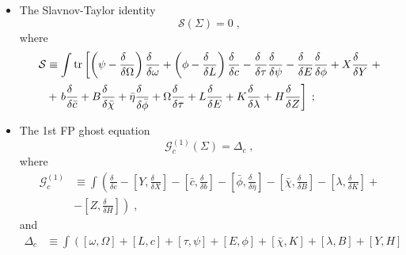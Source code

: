 \documentclass[../main.tex]{subfiles}
\begin{document}
\begin{itemize}
  \item  The Slavnov-Taylor identity
        \begin{equation}
          \label{eq:st-identity}
          \mathcal{S}\left(\Sigma\right)=0 \;,
        \end{equation}
        where
        \begin{align}
          \label{eq:SToperator}
          \mathcal{S} & \equiv \int \tr\left[\left(\psi-\frac{\delta\phantom{\Omega}}{\delta\Omega}\right)\frac{\delta\phantom{\omega }}{\delta \omega }+\left(\phi-\frac{\delta\phantom{L}}{\delta L}\right)\frac{\delta\phantom{c}}{\delta c}-\frac{\delta\phantom{\tau}}{\delta\tau}\frac{\delta\phantom{\psi}}{\delta\psi}-\frac{\delta\phantom{E}}{\delta E}\frac{\delta\phantom{\phi}}{\delta\phi}+X\frac{\delta\phantom{Y}}{\delta Y} \right. + \nonumber \\
                      & + \left. b\frac{\delta\phantom{\bar{c}}}{\delta\bar{c}}+B\frac{\delta\phantom{\bar{\chi}}}{\delta\bar{\chi}}+\bar{\eta}\frac{\delta\phantom{\bar{\phi}}}{\delta\bar{\phi}} + \Omega \frac{\delta\phantom{\tau}}{\delta\tau}+L\frac{\delta\phantom{E}}{\delta E}+K\frac{\delta\phantom{\lambda}}{\delta\lambda}+H\frac{\delta\phantom{Z}}{\delta Z}\right] \;;
        \end{align}
  \item The 1st FP ghost equation
        \begin{equation}
          \label{eq:1stfpghosteq}
          \mathcal{G}^{\left(1\right)}_c \left(\Sigma\right)=\Delta_c \;,
        \end{equation}
        where
        \begin{align}
          \label{eq:1stfpghostop}
          \mathcal{G}^{\left(1\right)}_c & \equiv \int \left(\frac{\delta\phantom{c}}{\delta c}-\left[Y,\frac{\delta\phantom{X}}{\delta X}\right]-\left[\bar{c},\frac{\delta\phantom{b}}{\delta b}\right]-\left[\bar{\phi},\frac{\delta\phantom{\bar{\eta}}}{\delta\bar{\eta}}\right]-\left[\bar{\chi},\frac{\delta\phantom{B}}{\delta B}\right]-\left[\lambda,\frac{\delta\phantom{K}}{\delta K}\right] + \right. \nonumber \\
                                         & \left. - \left[Z,\frac{\delta\phantom{H}}{\delta H}\right]\right) \;,
        \end{align}
        and
        \begin{align}
          \label{eq:linearbreakc}
          \Delta_c & \equiv \int \left(\left[\omega ,\Omega\right]+\left[L,c\right]+\left[\tau,\psi\right]+\left[E,\phi\right]+\left[\bar{\chi},K\right]+\left[\lambda,B\right] + \left[Y,H\right] \right. \nonumber \\

\end{align}
\end{itemize}
\end{document}
